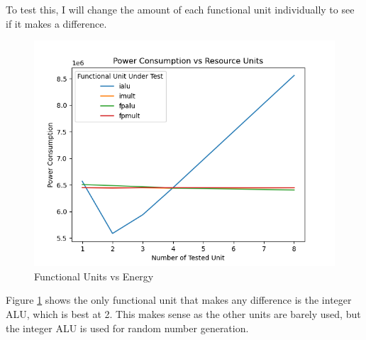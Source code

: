 \documentclass{article}
\begin{document}
\begin{multicols}{2}
  To test this, I will change the amount of each functional unit individually to see if it makes a difference.

  \begin{figure}[H]
    \centering
    \includegraphics[width=\linewidth]{./assets/units_vs_energy.png}
    \caption{Functional Units vs Energy}
    \label{fig:units_vs_energy}
  \end{figure}

  Figure \ref{fig:units_vs_energy} shows the only functional unit that makes any difference is the integer ALU, which is best at 2. This makes sense as the other units are barely used, but the integer ALU is used for random number generation.

\end{multicols}
\end{document}
